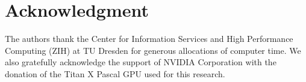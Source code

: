 \documentclass[twoside,twocolumn]{article}
\begin{document}


\section*{Acknowledgment}
\noindent The authors thank the Center for Information Services and High Performance Computing (ZIH) at TU
Dresden for generous allocations of computer time. We also gratefully acknowledge the support of NVIDIA Corporation 
with the donation of the Titan X Pascal GPU used for this research.









\end{document}
